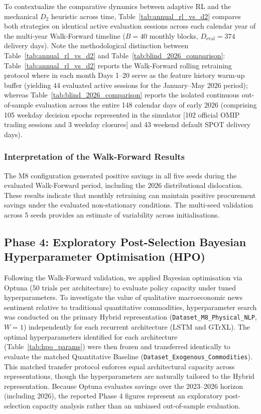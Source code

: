 To contextualize the comparative dynamics between adaptive RL and the mechanical $D_2$ heuristic across time, Table~\ref{tab:annual_rl_vs_d2} compares both strategies on identical active evaluation sessions across each calendar year of the multi-year Walk-Forward timeline ($B=40$ monthly blocks, $D_{\text{eval}} = 374$ delivery days). Note the methodological distinction between Table~\ref{tab:annual_rl_vs_d2} and Table~\ref{tab:blind_2026_comparison}: Table~\ref{tab:annual_rl_vs_d2} reports the Walk-Forward rolling retraining protocol where in each month Days 1--20 serve as the feature history warm-up buffer (yielding 44 evaluated active sessions for the January--May 2026 period); whereas Table~\ref{tab:blind_2026_comparison} reports the isolated continuous out-of-sample evaluation across the entire 148 calendar days of early 2026 (comprising 105 weekday decision epochs represented in the simulator [102 official OMIP trading sessions and 3 weekday closures] and 43 weekend default SPOT delivery days).

\subsubsection{Interpretation of the Walk-Forward Results}

The M8 configuration generated positive savings in all five seeds during the evaluated Walk-Forward period, including the 2026 distributional dislocation. These results indicate that monthly retraining can maintain positive procurement savings under the evaluated non-stationary conditions. The multi-seed validation across 5 seeds provides an estimate of variability across initialisations.

\subsection{Phase 4: Exploratory Post-Selection Bayesian Hyperparameter Optimisation (HPO)}
\label{subsec:res_phase4}

Following the Walk-Forward validation, we applied Bayesian optimisation via Optuna (50 trials per architecture) to evaluate policy capacity under tuned hyperparameters. To investigate the value of qualitative macroeconomic news sentiment relative to traditional quantitative commodities, hyperparameter search was conducted on the primary Hybrid representation (\texttt{Dataset\_\allowbreak M8\_\allowbreak Physical\_\allowbreak NLP}, $W=1$) independently for each recurrent architecture (LSTM and GTrXL). The optimal hyperparameters identified for each architecture (Table~\ref{tab:hpo_params}) were then frozen and transferred identically to evaluate the matched Quantitative Baseline (\texttt{Dataset\_\allowbreak Exogenous\_\allowbreak Commodities}). This matched transfer protocol enforces equal architectural capacity across representations, though the hyperparameters are naturally tailored to the Hybrid representation. Because Optuna evaluates savings over the 2023--2026 horizon (including 2026), the reported Phase 4 figures represent an exploratory post-selection capacity analysis rather than an unbiased out-of-sample evaluation.

